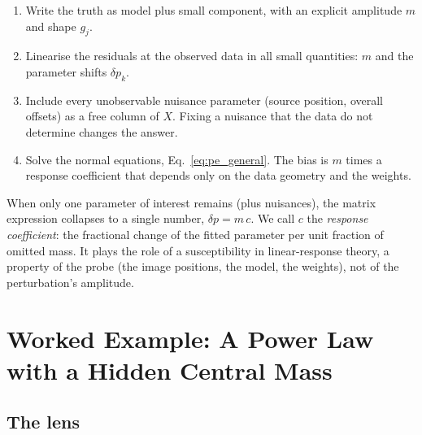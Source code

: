 \begin{keybox}
\begin{enumerate}[nosep]
    \item Write the truth as model plus small component, with an
          explicit amplitude $m$ and shape $g_j$.
    \item Linearise the residuals at the observed data in all
          small quantities: $m$ and the parameter shifts $\delta p_k$.
    \item Include every unobservable nuisance parameter (source
          position, overall offsets) as a free column of $X$. Fixing a
          nuisance that the data do not determine changes the answer.
    \item Solve the normal equations, Eq.~\eqref{eq:pe_general}. The
          bias is $m$ times a response coefficient that depends only on
          the data geometry and the weights.
\end{enumerate}
\end{keybox}

\begin{annotation}
When only one parameter of interest remains (plus nuisances), the
matrix expression collapses to a single number, $\delta p=m\,c$. We
call $c$ the \emph{response coefficient}: the fractional change of the
fitted parameter per unit fraction of omitted mass. It plays the role
of a susceptibility in linear-response theory, a property of the
probe (the image positions, the model, the weights), not of the
perturbation's amplitude.
\end{annotation}

\section{Worked Example: A Power Law with a Hidden Central Mass}
\label{sec:pe_setup}

\subsection{The lens}

